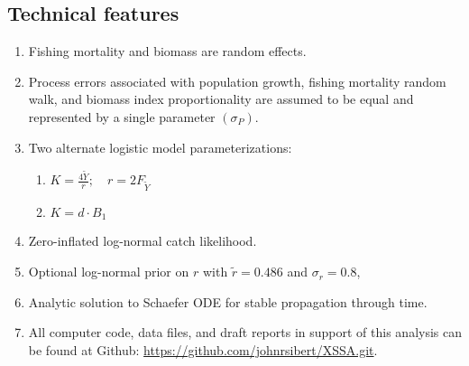 \documentclass[letterpaper,KOMA,landscape,titlepage]{powersem}
\newcommand\MSY{\widetilde{Y}}
\newcommand\Fmsy{F_{\MSY}}
\begin{document}
\begin{slide}\section{Technical features}
\begin{enumerate}
\item Fishing mortality and biomass are random effects.
\item Process errors associated with population growth, fishing
mortality random walk, and biomass index proportionality are assumed
to be equal and represented by a single parameter $(\sigma_P)$.
\item Two alternate logistic model parameterizations:
\begin{enumerate}
\item $K = \frac{4\MSY}{r};\quad r = 2\Fmsy$
\item $K = d\cdot B_1$
\end{enumerate}
\item Zero-inflated log-normal catch likelihood.
\item Optional log-normal prior on $r$ with 
$\tilde{r} = 0.486$ and $\sigma_r = 0.8$,
\item Analytic solution to Schaefer ODE for stable propagation
through time.
\item All computer code, data files, and draft reports in support of this
analysis can be found at Github:
\url{https://github.com/johnrsibert/XSSA.git}.
\end{enumerate}
\end{slide}
\end{document}
